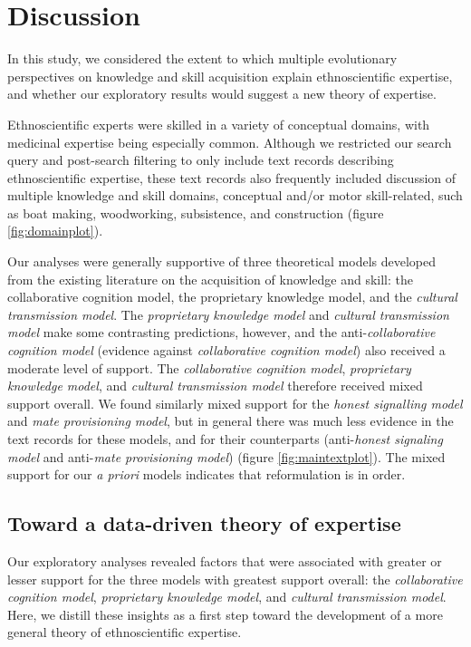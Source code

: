 \documentclass[
  11pt,
]{article}
\begin{document}
\hypertarget{discussion}{%
\section{Discussion}\label{discussion}}

In this study, we considered the extent to which multiple evolutionary perspectives on knowledge and skill acquisition explain ethnoscientific expertise, and whether our exploratory results would suggest a new theory of expertise.

Ethnoscientific experts were skilled in a variety of conceptual domains, with medicinal expertise being especially common. Although we restricted our search query and post-search filtering to only include text records describing ethnoscientific expertise, these text records also frequently included discussion of multiple knowledge and skill domains, conceptual and/or motor skill-related, such as boat making, woodworking, subsistence, and construction (figure \ref{fig:domainplot}).

Our analyses were generally supportive of three theoretical models developed from the existing literature on the acquisition of knowledge and skill: the collaborative cognition model, the proprietary knowledge model, and the \emph{cultural transmission model}. The \emph{proprietary knowledge model} and \emph{cultural transmission model} make some contrasting predictions, however, and the anti-\emph{collaborative cognition model} (evidence against \emph{collaborative cognition model}) also received a moderate level of support. The \emph{collaborative cognition model}, \emph{proprietary knowledge model}, and \emph{cultural transmission model} therefore received mixed support overall. We found similarly mixed support for the \emph{honest signalling model} and \emph{mate provisioning model}, but in general there was much less evidence in the text records for these models, and for their counterparts (anti-\emph{honest signaling model} and anti-\emph{mate provisioning model}) (figure \ref{fig:maintextplot}). The mixed support for our \emph{a priori} models indicates that reformulation is in order.

\hypertarget{toward-a-data-driven-theory-of-expertise}{%
\subsection{Toward a data-driven theory of expertise}\label{toward-a-data-driven-theory-of-expertise}}

Our exploratory analyses revealed factors that were associated with greater or lesser support for the three models with greatest support overall: the \emph{collaborative cognition model}, \emph{proprietary knowledge model}, and \emph{cultural transmission model}. Here, we distill these insights as a first step toward the development of a more general theory of ethnoscientific expertise.
\end{document}
